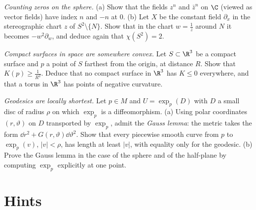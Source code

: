 \begin{exercise}[$\star$]\label{ex:chisphere}
\emph{Counting zeros on the sphere.} (a) Show that the fields $z^n$ and $\bar z^n$ on $\C$ (viewed as vector fields) have index $n$ and $-n$ at $0$. (b) Let $X$ be the constant field $\partial_x$ in the
stereographic chart $z$ of $S^2\setminus\{N\}$. Show that in the chart $w=\frac1z$ around $N$ it becomes $-w^2\partial_w$, and deduce again that $\chi(S^2)=2$.
\end{exercise}

\begin{exercise}[$\star$]\label{ex:positivepoint}
\emph{Compact surfaces in space are somewhere convex.} Let $S\subset\R^3$ be a compact surface and $p$ a point of $S$ farthest from the origin, at distance $R$. Show that
$K(p)\ge\frac1{R^2}$. Deduce that no compact surface in $\R^3$ has $K\le0$ everywhere, and that a torus in $\R^3$ has points of negative curvature.
\end{exercise}

\begin{exercise}[$\star\star$]\label{ex:geodlength}
\emph{Geodesics are locally shortest.} Let $p\in M$ and $U=\exp_p(D)$ with $D$ a small disc of radius $\rho$ on which $\exp_p$ is a diffeomorphism. (a) Using polar coordinates
$(r,\vartheta)$ on $D$ transported by $\exp_p$, admit the \emph{Gauss lemma}: the metric takes the form $\dd r^2+G(r,\vartheta)\dd\vartheta^2$. Show that every piecewise smooth curve from $p$ to
$\exp_p(v)$, $|v|<\rho$, has length at least $|v|$, with equality only for the geodesic. (b) Prove the Gauss lemma in the case of the sphere and of the half-plane by
computing $\exp_p$ explicitly at one point.
\end{exercise}

\section{Hints}

